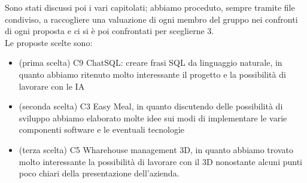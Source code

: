 \documentclass[12pt,a4paper]{article}
\begin{document}
Sono stati discussi poi i vari capitolati; abbiamo proceduto, sempre tramite
file
condiviso, a raccogliere una valuazione di ogni membro del gruppo nei confronti
di ogni proposta e ci si è poi confrontati per sceglierne 3.\\
Le proposte scelte sono:
\begin{itemize}
    \item (prima scelta) C9 ChatSQL: creare frasi SQL da linguaggio naturale,
          in
          quanto abbiamo ritenuto molto interessante il progetto e la
          possibilità di
          lavorare con le IA

    \item (seconda scelta) C3 Easy Meal, in quanto discutendo delle possibilità
          di
          sviluppo abbiamo elaborato molte idee sui modi di implementare le
          varie
          componenti software e le eventuali tecnologie
    \item (terza scelta) C5 Wharehouse management 3D, in quanto abbiamo trovato
          molto
          interessante la possibilità di lavorare con il 3D nonostante alcuni
          punti poco
          chiari della presentazione dell'azienda.
\end{itemize}
\end{document}
